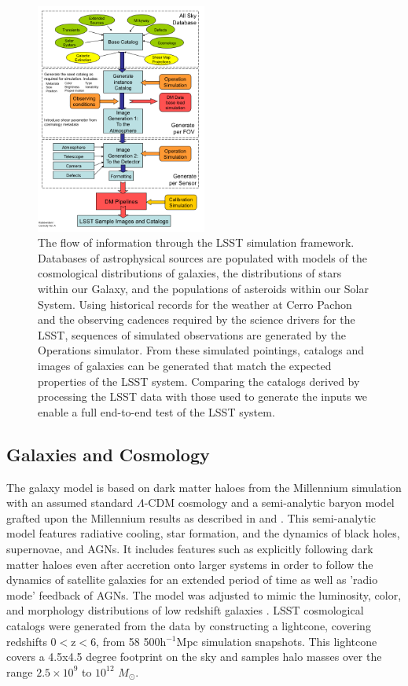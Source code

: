 \documentclass[]{article}
\begin{document}
\begin{figure}[h]
\centerline{\includegraphics[width=0.5\textwidth]{validation_figures/flow.png}}
\caption{The flow of information through the LSST simulation
 framework. Databases of astrophysical sources are populated with
 models of the cosmological distributions of galaxies, the
 distributions of stars within our Galaxy, and the populations of
 asteroids within our Solar System. Using historical records for the
 weather at Cerro Pachon and the observing cadences required by the
 science drivers for the LSST, sequences of simulated observations
 are generated by the Operations simulator. From these simulated
 pointings, catalogs and images of galaxies can be generated that
 match the expected properties of the LSST system. Comparing the
 catalogs derived by processing the LSST data with those used to
 generate the inputs we enable a full end-to-end test of the LSST
 system.}
\label{fig:flow}       %
\end{figure}


\subsection{Galaxies and Cosmology \label{sec:gal}}

The galaxy model is based on dark matter haloes from the Millennium
simulation \citep{springel05} with an assumed standard $\Lambda$-CDM
cosmology and a semi-analytic baryon model grafted upon the Millennium
results as described in \citet{springel05} and \citet{delucia}. This
semi-analytic model features radiative cooling, star formation, and
the dynamics of black holes, supernovae, and AGNs. It includes
features such as explicitly following dark matter haloes even
after accretion onto larger systems in order to follow the dynamics of
satellite galaxies for an extended period of time as well as 'radio
mode' feedback of AGNs. The model was adjusted to mimic the
luminosity, color, and morphology distributions of low redshift
galaxies \citep{delucia}. LSST cosmological catalogs were generated
from the \citet{delucia} data
by constructing a lightcone, covering redshifts 0$<$z$<$6, from 58
500h$^{-1}$Mpc simulation snapshots. This lightcone covers a 4.5x4.5
degree footprint on the sky and samples halo masses over the range
$2.5\times10^9$ to $10^{12}$ $M_\odot$. 
\end{document}
